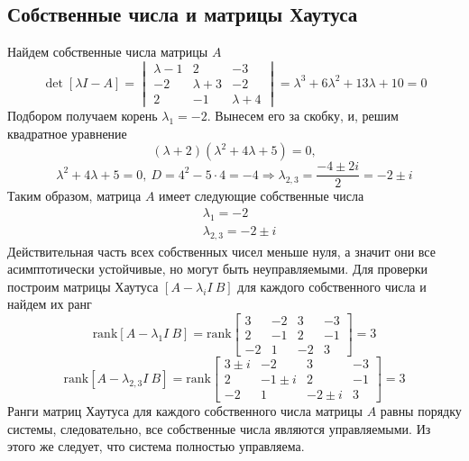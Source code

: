 \documentclass[a4paper, 12pt]{article}
\begin{document}
    \subsection{Собственные числа и матрицы Хаутуса}
    Найдем собственные числа матрицы $A$
    $$\det\left[\lambda I -A\right]=\begin{vmatrix}
        \lambda-1 &2 &-3\\
        -2 &\lambda+3 &-2\\
        2 &-1 &\lambda+4
    \end{vmatrix}=\lambda^3+6\lambda^2+13\lambda+10=0$$
    Подбором получаем корень $\lambda_1=-2$. Вынесем его за скобку, и, решим квадратное уравнение
    $$\left(\lambda+2\right)\left(\lambda^2+4\lambda+5\right)=0,$$
    $$\lambda^2+4\lambda+5=0,\ D=4^2-5\cdot4=-4\Rightarrow\lambda_{2,3}=\dfrac{-4\pm2i}{2}=-2\pm i$$
    Таким образом, матрица $A$ имеет следующие собственные числа
    \begin{align*}
        &\lambda_1=-2\\
        &\lambda_{2,3}=-2\pm i
    \end{align*}
    Действительная часть всех собственных чисел меньше нуля, а значит они все асимптотически устойчивые, но могут быть неуправляемыми.
    Для проверки построим матрицы Хаутуса $\left[A-\lambda_i I\ B\right]$ для каждого собственного числа и найдем их ранг
    $$\text{rank}\left[A-\lambda_1 I\ B\right]=\text{rank}\begin{bmatrix}
        3 &-2 &3 &-3\\
        2 &-1 &2 &-1\\
        -2 &1 &-2 &3
    \end{bmatrix}=3$$
    $$\text{rank}\left[A-\lambda_{2,3} I\ B\right]=\text{rank}\begin{bmatrix}
        3\pm i &-2 &3 &-3\\
        2 &-1\pm i &2 &-1\\
        -2 &1 &-2\pm i &3
    \end{bmatrix}=3$$
    Ранги матриц Хаутуса для каждого собственного числа матрицы $A$ равны порядку системы, следовательно, все
    собственные числа являются управляемыми. Из этого же следует, что система полностью управляема.
\end{document}

